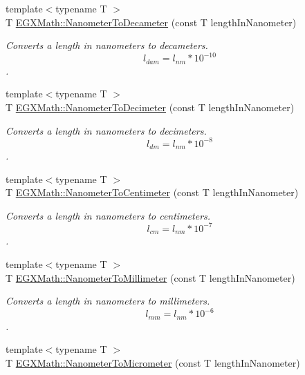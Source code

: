\begin{DoxyCompactItemize}
{\footnotesize template$<$typename T $>$ }\\T \mbox{\hyperlink{group___e_g_x_math-_conversions-_length_conversions-_s_i-_nanometer-_s_i_gabd4fa6935aab15cac606410d0da3b22d}{E\+G\+X\+Math\+::\+Nanometer\+To\+Decameter}} (const T length\+In\+Nanometer)
\begin{DoxyCompactList}\small\item\em Converts a length in nanometers to decameters. \[ l_{dam}=l_{nm} * 10^{-10} \]. \end{DoxyCompactList}\item 
{\footnotesize template$<$typename T $>$ }\\T \mbox{\hyperlink{group___e_g_x_math-_conversions-_length_conversions-_s_i-_nanometer-_s_i_ga3be41b7dc346f2f5745d761c9f6c743d}{E\+G\+X\+Math\+::\+Nanometer\+To\+Decimeter}} (const T length\+In\+Nanometer)
\begin{DoxyCompactList}\small\item\em Converts a length in nanometers to decimeters. \[ l_{dm}=l_{nm} * 10^{-8} \]. \end{DoxyCompactList}\item 
{\footnotesize template$<$typename T $>$ }\\T \mbox{\hyperlink{group___e_g_x_math-_conversions-_length_conversions-_s_i-_nanometer-_s_i_ga8c37dcaf6ef783c2cf44af0f65633841}{E\+G\+X\+Math\+::\+Nanometer\+To\+Centimeter}} (const T length\+In\+Nanometer)
\begin{DoxyCompactList}\small\item\em Converts a length in nanometers to centimeters. \[ l_{cm}=l_{nm} * 10^{-7} \]. \end{DoxyCompactList}\item 
{\footnotesize template$<$typename T $>$ }\\T \mbox{\hyperlink{group___e_g_x_math-_conversions-_length_conversions-_s_i-_nanometer-_s_i_gac8b870837f9a0213c8383079437e8cc6}{E\+G\+X\+Math\+::\+Nanometer\+To\+Millimeter}} (const T length\+In\+Nanometer)
\begin{DoxyCompactList}\small\item\em Converts a length in nanometers to millimeters. \[ l_{mm}=l_{nm} * 10^{-6} \]. \end{DoxyCompactList}\item 
{\footnotesize template$<$typename T $>$ }\\T \mbox{\hyperlink{group___e_g_x_math-_conversions-_length_conversions-_s_i-_nanometer-_s_i_gaa539df5d709bface86429c8a25d7f6e1}{E\+G\+X\+Math\+::\+Nanometer\+To\+Micrometer}} (const T length\+In\+Nanometer)

\end{DoxyCompactItemize}
